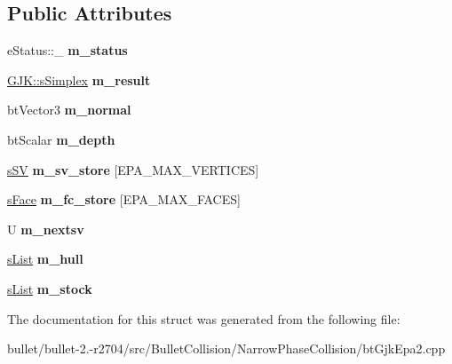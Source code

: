 \subsection*{Public Attributes}
\begin{DoxyCompactItemize}
\item 
\hypertarget{structgjkepa2__impl_1_1_e_p_a_ad364c49ac6b754b7aa56b4e7322739f7}{e\+Status\+::\+\_\+ {\bfseries m\+\_\+status}}\label{structgjkepa2__impl_1_1_e_p_a_ad364c49ac6b754b7aa56b4e7322739f7}

\item 
\hypertarget{structgjkepa2__impl_1_1_e_p_a_a38aac942239d780dbf019a5bbd815bba}{\hyperlink{structgjkepa2__impl_1_1_g_j_k_1_1s_simplex}{G\+J\+K\+::s\+Simplex} {\bfseries m\+\_\+result}}\label{structgjkepa2__impl_1_1_e_p_a_a38aac942239d780dbf019a5bbd815bba}

\item 
\hypertarget{structgjkepa2__impl_1_1_e_p_a_a3771e3e7e8e99cbca0e5ce27ef505bd1}{bt\+Vector3 {\bfseries m\+\_\+normal}}\label{structgjkepa2__impl_1_1_e_p_a_a3771e3e7e8e99cbca0e5ce27ef505bd1}

\item 
\hypertarget{structgjkepa2__impl_1_1_e_p_a_a7329b93546644d254bb01193b324f80a}{bt\+Scalar {\bfseries m\+\_\+depth}}\label{structgjkepa2__impl_1_1_e_p_a_a7329b93546644d254bb01193b324f80a}

\item 
\hypertarget{structgjkepa2__impl_1_1_e_p_a_a5c2c3d064d13f1270ed589c090b62d05}{\hyperlink{structgjkepa2__impl_1_1_g_j_k_1_1s_s_v}{s\+S\+V} {\bfseries m\+\_\+sv\+\_\+store} \mbox{[}E\+P\+A\+\_\+\+M\+A\+X\+\_\+\+V\+E\+R\+T\+I\+C\+E\+S\mbox{]}}\label{structgjkepa2__impl_1_1_e_p_a_a5c2c3d064d13f1270ed589c090b62d05}

\item 
\hypertarget{structgjkepa2__impl_1_1_e_p_a_ab0293865869ece92d35106a0d4bf6dda}{\hyperlink{structgjkepa2__impl_1_1_e_p_a_1_1s_face}{s\+Face} {\bfseries m\+\_\+fc\+\_\+store} \mbox{[}E\+P\+A\+\_\+\+M\+A\+X\+\_\+\+F\+A\+C\+E\+S\mbox{]}}\label{structgjkepa2__impl_1_1_e_p_a_ab0293865869ece92d35106a0d4bf6dda}

\item 
\hypertarget{structgjkepa2__impl_1_1_e_p_a_ad140d2e9afab9280d11b1175d42994c9}{U {\bfseries m\+\_\+nextsv}}\label{structgjkepa2__impl_1_1_e_p_a_ad140d2e9afab9280d11b1175d42994c9}

\item 
\hypertarget{structgjkepa2__impl_1_1_e_p_a_ab5f509efd64c357fc587136f30242d0e}{\hyperlink{structgjkepa2__impl_1_1_e_p_a_1_1s_list}{s\+List} {\bfseries m\+\_\+hull}}\label{structgjkepa2__impl_1_1_e_p_a_ab5f509efd64c357fc587136f30242d0e}

\item 
\hypertarget{structgjkepa2__impl_1_1_e_p_a_abf546eab1bcce4dce9df72d4d404dce6}{\hyperlink{structgjkepa2__impl_1_1_e_p_a_1_1s_list}{s\+List} {\bfseries m\+\_\+stock}}\label{structgjkepa2__impl_1_1_e_p_a_abf546eab1bcce4dce9df72d4d404dce6}

\end{DoxyCompactItemize}


The documentation for this struct was generated from the following file\+:\begin{DoxyCompactItemize}
\item 
bullet/bullet-\/2.-\/r2704/src/\+Bullet\+Collision/\+Narrow\+Phase\+Collision/bt\+Gjk\+Epa2.\+cpp\end{DoxyCompactItemize}

